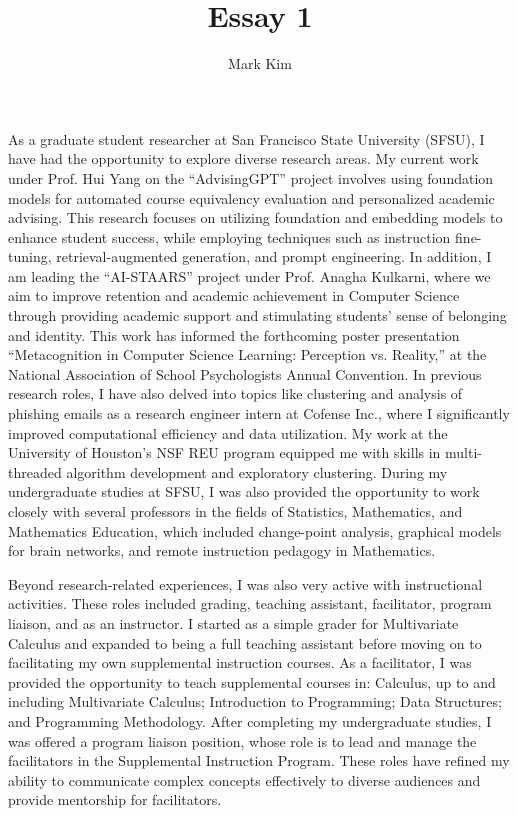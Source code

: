 \documentclass[12pt]{article}
\author{Mark Kim}
\title{Essay 1}
\begin{document}
\maketitle

As a graduate student researcher at San Francisco State University (SFSU), I have had the opportunity to explore diverse research areas. My
current work under Prof. Hui Yang on the ``AdvisingGPT'' project involves using foundation models for automated course equivalency evaluation and
personalized academic advising. This research focuses on utilizing foundation and embedding models to enhance student success, while
employing techniques such as instruction fine-tuning, retrieval-augmented generation, and prompt engineering. In addition, I am leading
the ``AI-STAARS'' project under Prof. Anagha Kulkarni, where we aim to improve retention and academic achievement in Computer Science through
providing academic support and stimulating students' sense of belonging and identity.  This work has informed the forthcoming
poster presentation ``Metacognition in Computer Science Learning: Perception vs. Reality,'' at the National Association of School
Psychologists Annual Convention.  In previous research roles, I have also delved into topics like clustering and analysis of phishing emails
as a research engineer intern at Cofense Inc., where I significantly improved computational efficiency and data utilization. My work at the
University of Houston's NSF REU program equipped me with skills in multi-threaded algorithm development and exploratory clustering.  During
my undergraduate studies at SFSU, I was also provided the opportunity to work closely with several professors in the fields of
Statistics, Mathematics, and Mathematics Education, which included change-point analysis, graphical models for brain networks, and remote
instruction pedagogy in Mathematics.

Beyond research-related experiences, I was also very active with instructional activities.  These roles included grading, teaching
assistant, facilitator, program liaison, and as an instructor.  I started as a simple grader for Multivariate Calculus and expanded to being
a full teaching assistant before moving on to facilitating my own supplemental instruction courses.  As a facilitator, I was provided the
opportunity to teach supplemental courses in: Calculus, up to and including Multivariate Calculus; Introduction to Programming; Data
Structures; and Programming Methodology.  After completing my undergraduate studies, I was offered a program liaison position, whose role
is to lead and manage the facilitators in the Supplemental Instruction Program.  These roles have refined my ability to communicate complex
concepts effectively to diverse audiences and provide mentorship for facilitators.
\end{document}
